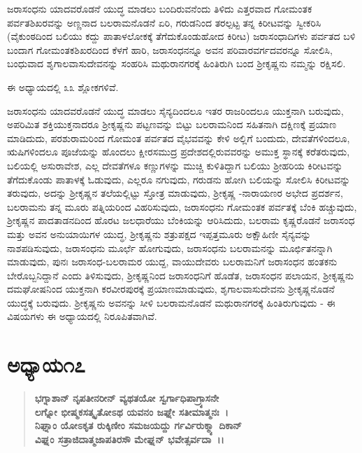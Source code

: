 \vskip 2pt

ಜರಾಸಂಧನು ಯಾದವರೊಡನೆ ಯುದ್ಧ ಮಾಡಲು ಬಂದಿರುವನೆಂದು ತಿಳಿದು ಎತ್ತರವಾದ ಗೋಮಂತಕ ಪರ್ವತಶಿಖರವನ್ನು ಅಣ್ಣನಾದ ಬಲರಾಮನೊಡನೆ ಏರಿ, ಗರುಡನಿಂದ ತರಲ್ಪಟ್ಟ ತನ್ನ ಕಿರೀಟವನ್ನು ಸ್ವೀಕರಿಸಿ (ವೈಕುಂಠದಿಂದ ಬಲಿಯು ಕದ್ದು ಪಾತಾಳಲೋಕಕ್ಕೆ ತೆಗೆದುಕೊಂಡುಹೋದ ಕಿರೀಟ) ಜರಾಸಂಧಾದಿಗಳು ಪರ್ವತದ ಬಳಿ ಬಂದಾಗ ಗೋಮಂತಕಶಿಖರದಿಂದ ಕೆಳಗೆ ಹಾರಿ, ಜರಾಸಂಧನನ್ನೂ ಅವನ ಪರಿವಾರವರ್ಗದವರನ್ನೂ ಸೋಲಿಸಿ, ಬಂಧುವಾದ ಶೃಗಾಲವಾಸುದೇವನನ್ನು ಸಂಹರಿಸಿ ಮಥುರಾನಗರಕ್ಕೆ ಹಿಂತಿರುಗಿ ಬಂದ ಶ‍್ರೀಕೃಷ್ಣನು ನಮ್ಮನ್ನು ರಕ್ಷಿಸಲಿ.

\vskip 2pt

ಈ ಅಧ್ಯಾಯದಲ್ಲಿ ೩೩ ಶ್ಲೋಕಗಳಿವೆ.

\vskip 2pt

ಜರಾಸಂಧನು ಯಾದವರೊಡನೆ ಯುದ್ಧ ಮಾಡಲು ಸೈನ್ಯದಿಂದಲೂ ಇತರ ರಾಜರಿಂದಲೂ ಯುಕ್ತನಾಗಿ ಬರುವುದು, ಅಪರಿಮಿತ ಶಕ್ತಿಯುಕ್ತನಾದರೂ ಶ‍್ರೀಕೃಷ್ಣನು ಪಟ್ಟಣ\-ವನ್ನು ಬಿಟ್ಟು ಬಲರಾಮನಿಂದ ಸಹಿತನಾಗಿ ದಕ್ಷಿಣಕ್ಕೆ ಪ್ರಯಾಣ ಮಾಡಿದುದು, ಪರಶುರಾಮರಿಂದ ಗೋಮಂತ ಪರ್ವತದ ವೈಭವವನ್ನು ಕೇಳಿ ಅಲ್ಲಿಗೆ ಬಂದುದು, ದೇವತೆಗಳಿಂದಲೂ, ಋಷಿಗಳಿಂದಲೂ ಪೂಜೆಯನ್ನು ಹೊಂದಲು ಕ್ಷೀರಸಮುದ್ರ ಪ್ರದೇಶದಲ್ಲಿರುವವರನ್ನು ಅಮುಕ್ತ ಸ್ಥಾನಕ್ಕೆ ಕರೆತರುವುದು, ಬಲಿಯಲ್ಲಿ ಅಸುರಾವೇಶ, ಎಲ್ಲ ದೇವತೆಗಳೂ ಕಣ್ಣುಗಳನ್ನು ಮುಚ್ಚಿ ಕುಳಿತಿದ್ದಾಗ ಬಲಿಯು ಶ‍್ರೀಹರಿಯ ಕಿರೀಟವನ್ನು ತೆಗೆದುಕೊಂಡು ಪಾತಾಳಕ್ಕೆ ಓಡುವುದು, ಎಲ್ಲರೂ ನಗುವುದು, ಗರುಡನು ಹೋಗಿ ಬಲಿಯನ್ನು ಸೋಲಿಸಿ ಕಿರೀಟವನ್ನು ತರುವುದು, ಅದನ್ನು ಶ‍್ರೀಕೃಷ್ಣನ ತಲೆಯಲ್ಲಿಟ್ಟು ಸ್ತೋತ್ರ ಮಾಡುವುದು, ಶ‍್ರೀಕೃಷ್ಣ -\break ನಾರಾಯಣರ ಅಭೇದ ಪ್ರದರ್ಶನ, ಬಲರಾಮನು ತನ್ನ ಮೂರು ಪತ್ನಿಯರಿಂದ ವಿಹರಿಸುವುದು, ಜರಾಸಂಧನು ಗೋಮಂತಕ ಪರ್ವತಕ್ಕೆ ಬೆಂಕಿ ಹಚ್ಚುವುದು, ಶ‍್ರೀಕೃಷ್ಣನ ಪಾದತಾಡನದಿಂದ ಹೊರಟ ಜಲಧಾರೆಯು ಬೆಂಕಿಯನ್ನು ಆರಿಸಿದುದು, ಬಲರಾಮ ಕೃಷ್ಣರೊಡನೆ ಜರಾಸಂಧ ಮತ್ತು ಅವನ ಅನುಯಾಯಿಗಳ ಯುದ್ಧ, ಶ‍್ರೀಕೃಷ್ಣನು ಶತ್ರುಪಕ್ಷದ ಇಪ್ಪತ್ತಮೂರು ಅಕ್ಷೌಹಿಣೀ ಸೈನ್ಯವನ್ನು ನಾಶಪಡಿಸುವುದು, ಜರಾಸಂಧನು ಮೂರ್ಛೆ ಹೋಗುವುದು, ಜರಾಸಂಧನು ಬಲರಾಮನನ್ನು ಮೂರ್ಛಿತನನ್ನಾಗಿ ಮಾಡುವುದು, ಪುನಃ ಜರಾಸಂಧ-ಬಲರಾಮರ ಯುದ್ದ, ವಾಯುದೇವರು ಬಲರಾಮನಿಗೆ ಜರಾಸಂಧನ ಹಂತಕನು ಬೇರೊಬ್ಬನಿದ್ದಾನೆ ಎಂದು ತಿಳಿಸುವುದು, ಶ‍್ರೀಕೃಷ್ಣನಿಂದ ಜರಾಸಂಧನಿಗೆ ಹೊಡೆತ, ಜರಾಸಂಧನ ಪಲಾಯನ, ಶ‍್ರೀಕೃಷ್ಣನು ದಮಘೋಷನಿಂದ ಯುಕ್ತನಾಗಿ ಕರವೀರಪುರಕ್ಕೆ ಪ್ರಯಾಣಮಾಡುವುದು, ಶೃಗಾಲವಾಸುದೇವನು ಶ‍್ರೀಕೃಷ್ಣನೊಡನೆ ಯುದ್ಧಕ್ಕೆ ಬರುವುದು. ಶ‍್ರೀಕೃಷ್ಣನು ಅವನನ್ನು ಸೀಳಿ ಬಲರಾಮನೊಡನೆ ಮಥುರಾನಗರಕ್ಕೆ ಹಿಂತಿರುಗುವುದು - ಈ ವಿಷಯಗಳು ಈ ಅಧ್ಯಾಯದಲ್ಲಿ ನಿರೂಪಿತವಾಗಿವೆ.

\newpage

\section*{ಅಧ್ಯಾಯ\enginline{-}೧೭}

\begin{verse}
\textbf{ಭಗ್ನಾಶಾನ್ ನೃಪತೀನರೀನ್ ವ್ಯಥತಯೋ ಸ್ವರ್ಗಾಧಿಪಾಗ್ರ್ಯಾಸನೇ} \\\textbf{ಲಗ್ನೋ ಭೀಷ್ಮಕಸತ್ಕೃತೋಽಥ ಯವನಂ ಜಘ್ನೇ ಸತೀಮಾತ್ಮನಃ~।}\\\textbf{ನಿಘ್ನಾಂ ಯೋಽಕೃತ ರುಕ್ಕಿಣೀಂ ಸಮಜಯದ್ದು ರ್ಗರ್ವಿರುಕ್ಮ್ಯಾ ದಿಕಾನ್} \\\textbf{ವಿಘ್ನಂ ಸತ್ರಾಜಿದಾತ್ಮಜಾಪತಿರಸೌ ಮೇಘ್ನನ್ ಭವೇತ್ಸರ್ವದಾ~।।}
\end{verse}


